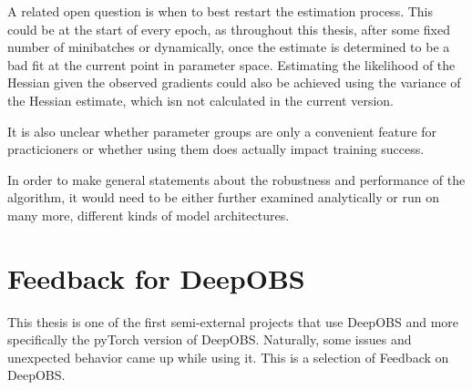 \documentclass[twoside,12pt,a4paper]{report}
\begin{document}
A related open question is when to best restart the estimation process. This could be at the start of every epoch, as throughout this thesis, after some fixed number of minibatches or dynamically, once the estimate is determined to be a bad fit at the current point in parameter space. Estimating the likelihood of the Hessian given the observed gradients could also be achieved using the variance of the Hessian estimate, which isn not calculated in the current version.

It is also unclear whether parameter groups are only a convenient feature for practicioners or whether using them does actually impact training success.

In order to make general statements about the robustness and performance of the algorithm, it would need to be either further examined analytically or run on many more, different kinds of model architectures.

\section{Feedback for DeepOBS}
This thesis is one of the first semi-external projects that use DeepOBS and more specifically the pyTorch version of DeepOBS. Naturally, some issues and unexpected behavior came up while using it. This is a selection of Feedback on DeepOBS.
\end{document}
